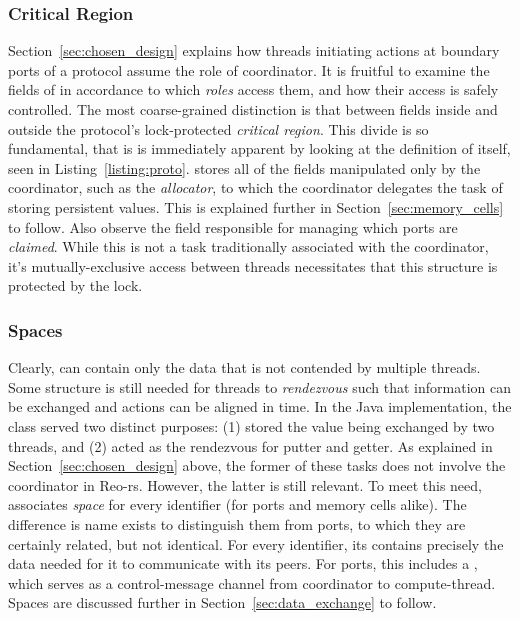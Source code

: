 \subsubsection{Critical Region}
Section~\ref{sec:chosen_design} explains how threads initiating actions at boundary ports of a protocol assume the role of coordinator. It is fruitful to examine the fields of  in accordance to which \textit{roles} access them, and how their access is safely controlled. The most coarse-grained distinction is that between fields inside and outside the protocol's lock-protected \textit{critical region}. This divide is so fundamental, that is is immediately apparent by looking at the definition of  itself, seen in Listing~\ref{listing:proto}.  stores all of the fields manipulated only by the coordinator, such as the \textit{allocator}, to which the coordinator delegates the task of storing persistent values. This is explained further in Section~\ref{sec:memory_cells} to follow. Also observe the field responsible for managing which ports are \textit{claimed}. While this is not a task traditionally associated with the coordinator, it's mutually-exclusive access between threads necessitates that this structure is protected by the lock.

\subsubsection{Spaces}
Clearly,  can contain only the data that is not contended by multiple threads. Some structure is still needed for threads to \textit{rendezvous} such that information can be exchanged and actions can be aligned in time. In the Java implementation, the class  served two distinct purposes: (1) stored the value being exchanged by two threads, and (2) acted as the rendezvous for putter and getter. As explained in Section~\ref{sec:chosen_design} above, the former of these tasks does not involve the coordinator in Reo-rs. However, the latter is still relevant. To meet this need,  associates \textit{space} for every identifier (for ports and memory cells alike). The difference is name exists to distinguish them from ports, to which they are certainly related, but not identical. For every identifier, its  contains precisely the data needed for it to communicate with its peers. For ports, this includes a , which serves as a control-message channel from coordinator to compute-thread. Spaces are discussed further in Section~\ref{sec:data_exchange} to follow. 

